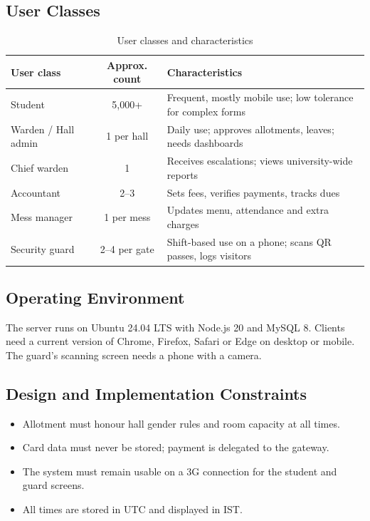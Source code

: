 \documentclass[11pt,a4paper]{report}
\begin{document}
\subsection{User Classes}
\begin{table}[H]
\centering\small
\caption{User classes and characteristics}\label{tab:users}
\begin{tabularx}{\textwidth}{lcL}
\toprule
\textbf{User class} & \textbf{Approx. count} & \textbf{Characteristics}\\
\midrule
Student & 5,000+ & Frequent, mostly mobile use; low tolerance for complex forms\\
Warden / Hall admin & 1 per hall & Daily use; approves allotments, leaves; needs dashboards\\
Chief warden & 1 & Receives escalations; views university-wide reports\\
Accountant & 2--3 & Sets fees, verifies payments, tracks dues\\
Mess manager & 1 per mess & Updates menu, attendance and extra charges\\
Security guard & 2--4 per gate & Shift-based use on a phone; scans QR passes, logs visitors\\
\bottomrule
\end{tabularx}
\end{table}

\subsection{Operating Environment}
The server runs on Ubuntu 24.04 LTS with Node.js 20 and MySQL 8. Clients need a current version of Chrome, Firefox, Safari or Edge on desktop or mobile. The guard's scanning screen needs a phone with a camera.

\subsection{Design and Implementation Constraints}
\begin{itemize}
  \item Allotment must honour hall gender rules and room capacity at all times.
  \item Card data must never be stored; payment is delegated to the gateway.
  \item The system must remain usable on a 3G connection for the student and guard screens.
  \item All times are stored in UTC and displayed in IST.
\end{itemize}
\end{document}
